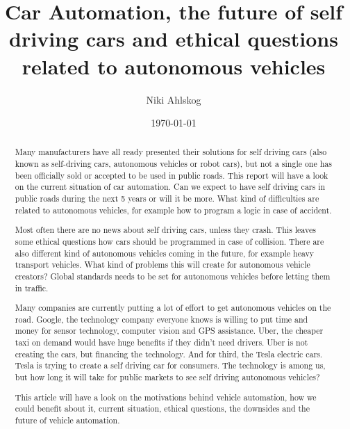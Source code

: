 \documentclass[english]{tktltiki}
\begin{document}
\onehalfspacing

\title{Car Automation, the future of self driving cars and ethical questions 
related to autonomous vehicles}
\author{Niki Ahlskog}
\date{\today}

\maketitle




\begin{abstract}

Many manufacturers have all ready presented their solutions for self driving 
cars (also known as self-driving cars, autonomous vehicles or robot cars), but 
not a single one has been officially sold or accepted to be used in public 
roads. This report will have a look on the current situation of car automation. 
Can we expect to have self driving cars in public roads during the next 5 years 
or will it be more. What kind of difficulties are related to autonomous 
vehicles, for example how to program a logic in case of accident.


Most often there are no news about self driving cars, unless they crash. This 
leaves some ethical questions how cars should be programmed in case of 
collision. There are also different kind of autonomous vehicles coming in the 
future, for example heavy transport vehicles. What kind of problems this will 
create for autonomous vehicle creators? Global standards needs to be set for 
autonomous vehicles before letting them in traffic.

Many companies are currently putting a lot of effort to get autonomous vehicles 
on the road. Google, the technology company everyone knows is willing to put 
time and money for sensor technology, computer vision and GPS assistance. Uber, 
the cheaper taxi on demand would have huge benefits if they didn't need drivers. 
Uber is not creating the cars, but financing the technology. And for third, the 
Tesla electric cars. Tesla is trying to create a self driving car for consumers. 
The technology is among us, but how long it will take for public markets to see 
self driving autonomous vehicles?

This article will have a look on the motivations behind vehicle automation, how 
we could benefit about it, current situation, ethical questions, the downsides 
and the future of vehicle automation.


\end{abstract}
\end{document}
